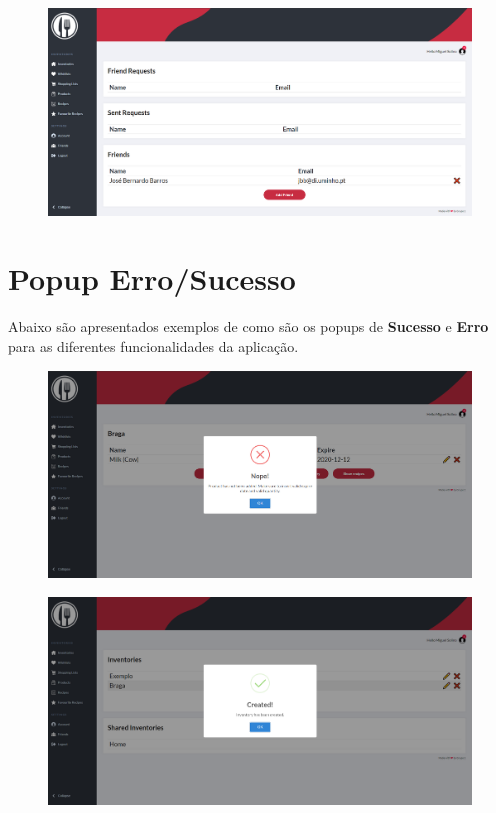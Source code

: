 \documentclass[a4paper]{report}
\begin{document}
    \begin{figure}[H]
        \centering
            \includegraphics[width=\textwidth]{images/produto_final/amigo_adicionado.png}
    \end{figure}

    \section{Popup Erro/Sucesso}

    Abaixo são apresentados exemplos de como são os popups de \textbf{Sucesso} 
    e \textbf{Erro} para as diferentes funcionalidades da aplicação.

    \begin{figure}[H]
        \centering
            \includegraphics[width=\textwidth]{images/produto_final/exemplo_erro.png}
    \end{figure}

    \begin{figure}[H]
        \centering
            \includegraphics[width=\textwidth]{images/produto_final/exemplo_sucesso.png}
    \end{figure}
\end{document}
